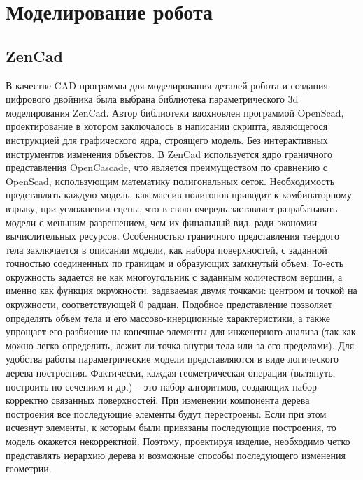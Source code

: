 \section{Моделирование робота}
\subsection{ZenCad}
В качестве CAD программы для моделирования деталей робота и создания цифрового двойника была выбрана библиотека параметрического 3d моделирования ZenCad. Автор библиотеки вдохновлен программой OpenScad, проектирование в котором заключалось в написании скрипта, являющегося инструкцией для графического ядра, строящего модель. Без интерактивных инструментов изменения объектов. В ZenCad используется ядро граничного представления OpenCascade, что является преимуществом по сравнению с OpenScad, использующим математику полигональных сеток. Необходимость представлять каждую модель, как массив полигонов приводит к комбинаторному взрыву, при усложнении сцены, что в свою очередь заставляет разрабатывать модели с меньшим разрешением, чем их финальный вид, ради экономии вычислительных ресурсов. Особенностью граничного представления твёрдого тела заключается в описании модели, как набора поверхностей, с заданной точностью соединенных по границам и образующих замкнутый объем. То-есть окружность задается не как многоугольник с заданным количеством вершин, а именно как функция окружности, задаваемая двумя точками: центром и точкой на окружности, соответствующей 0 радиан. Подобное представление позволяет определять объем тела и его массово-инерционные характеристики, а также упрощает его разбиение на конечные элементы для инженерного анализа (так как можно легко определить, лежит ли точка внутри тела или за его пределами). Для удобства работы параметрические модели представляются в виде логического дерева построения. Фактически, каждая геометрическая операция (вытянуть, построить по сечениям и др.) – это набор алгоритмов, создающих набор корректно связанных поверхностей. При изменении компонента дерева построения все последующие элементы будут перестроены. Если при этом исчезнут элементы, к которым были привязаны последующие построения, то модель окажется некорректной. Поэтому, проектируя изделие, необходимо четко представлять иерархию дерева и возможные способы последующего изменения геометрии.

